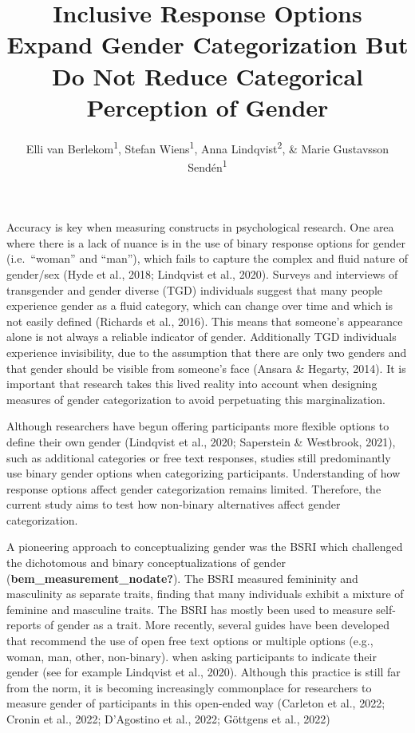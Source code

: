 \documentclass[
  man]{apa7}
\title{Inclusive Response Options Expand Gender Categorization But Do Not Reduce Categorical Perception of Gender}
\author{Elli van Berlekom\textsuperscript{1}, Stefan Wiens\textsuperscript{1}, Anna Lindqvist\textsuperscript{2}, \& Marie Gustavsson Sendén\textsuperscript{1}}
\date{}
\affiliation{\vspace{0.5cm}\textsuperscript{1} Stockholm University\\\textsuperscript{2} Lund University}
\begin{document}
\maketitle

Accuracy is key when measuring constructs in psychological research. One area where there is a lack of nuance is in the use of binary response options for gender (i.e.~``woman'' and ``man''), which fails to capture the complex and fluid nature of gender/sex (Hyde et al., 2018; Lindqvist et al., 2020). Surveys and interviews of transgender and gender diverse (TGD) individuals suggest that many people experience gender as a fluid category, which can change over time and which is not easily defined (Richards et al., 2016). This means that someone's appearance alone is not always a reliable indicator of gender. Additionally TGD individuals experience invisibility, due to the assumption that there are only two genders and that gender should be visible from someone's face (Ansara \& Hegarty, 2014). It is important that research takes this lived reality into account when designing measures of gender categorization to avoid perpetuating this marginalization.

Although researchers have begun offering participants more flexible options to define their own gender (Lindqvist et al., 2020; Saperstein \& Westbrook, 2021), such as additional categories or free text responses, studies still predominantly use binary gender options when categorizing participants. Understanding of how response options affect gender categorization remains limited. Therefore, the current study aims to test how non-binary alternatives affect gender categorization.

A pioneering approach to conceptualizing gender was the BSRI which challenged the dichotomous and binary conceptualizations of gender (\textbf{bem\_measurement\_nodate?}). The BSRI measured femininity and masculinity as separate traits, finding that many individuals exhibit a mixture of feminine and masculine traits. The BSRI has mostly been used to measure self-reports of gender as a trait. More recently, several guides have been developed that recommend the use of open free text options or multiple options (e.g., woman, man, other, non-binary). when asking participants to indicate their gender (see for example Lindqvist et al., 2020). Although this practice is still far from the norm, it is becoming increasingly commonplace for researchers to measure gender of participants in this open-ended way (Carleton et al., 2022; Cronin et al., 2022; D'Agostino et al., 2022; Göttgens et al., 2022)
\end{document}
